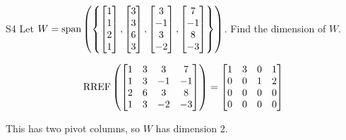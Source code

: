 \documentclass{sbgLAquiz}
\begin{document}
\begin{problem}{S4}
Let $W = {\rm span} \left( \left\{ \begin{bmatrix} 1 \\ 1 \\ 2 \\ 1 \end{bmatrix}, \begin{bmatrix} 3 \\ 3 \\ 6 \\ 3 \end{bmatrix}, \begin{bmatrix} 3 \\ -1 \\ 3 \\ -2 \end{bmatrix}, \begin{bmatrix} 7 \\ -1 \\ 8 \\ -3 \end{bmatrix} \right\} \right)$.  Find the dimension of $W$.
\end{problem}
\begin{solution}
$$\operatorname{RREF}\left(\begin{bmatrix} 1 & 3 & 3 & 7 \\ 1 & 3 & -1 & -1 \\ 2 & 6 & 3 & 8 \\ 1 & 3 & -2 & -3 \end{bmatrix}\right) = \begin{bmatrix} 1 & 3 & 0 & 1 \\ 0 & 0 & 1 & 2 \\ 0 & 0 & 0 & 0 \\  0 & 0 & 0 & 0 \end{bmatrix}$$

This has two pivot columns, so $W$ has dimension 2.
\end{solution}
\end{document}
